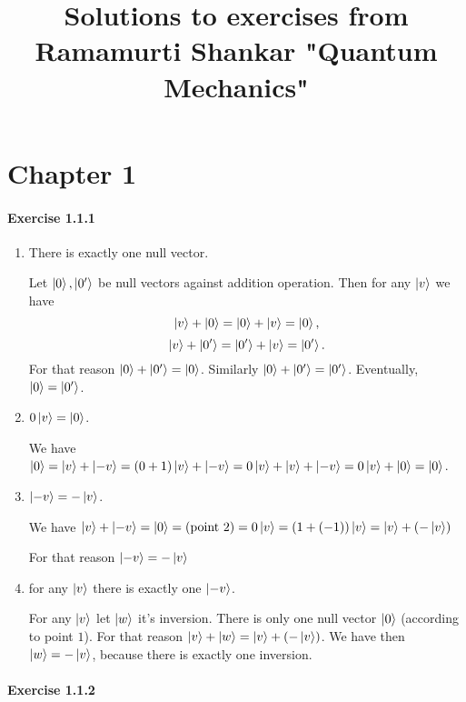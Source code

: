 \documentclass[a4paper]{article}
\title{Solutions to exercises from Ramamurti Shankar "Quantum Mechanics"}
\date{}
\begin{document}
\maketitle
\tableofcontents

\section{Chapter 1}

\paragraph{Exercise 1.1.1}

\begin{enumerate}
    \item There is exactly one null vector.

    Let $\ket{0}, \ket{0'}$ be null vectors against addition operation. Then for any $\ket{v}$ we have
    $$
        \ket{v} + \ket{0} = \ket{0} + \ket{v} = \ket{0},
    $$
    $$
        \ket{v} + \ket{0'} = \ket{0'} + \ket{v} = \ket{0'}.
    $$
    For that reason $\ket{0} + \ket{0'} = \ket{0}$. Similarly $\ket{0} + \ket{0'} = \ket{0'}$. Eventually, $\ket{0} = \ket{0'}$.

    \item $0 \ket{v} = \ket{0}$.

    We have $\ket{0} = \ket{v} + \ket{-v} = (0 + 1) \ket{v} + \ket{-v} = 0 \ket{v} + \ket{v} + \ket{-v} = 0 \ket{v} + \ket{0} = \ket{0}$.

    \item $\ket{- v} = - \ket{v}$.

    We have $\ket{v} + \ket{-v} = \ket{0} = \textrm{(point 2)} = 0 \ket{v} = (1 + (-1)) \ket{v} = \ket{v} + (- \ket{v})$

    For that reason $\ket{- v} = - \ket{v}$

    \item for any $\ket{v}$ there is exactly one $\ket{- v}$.

    For any $\ket{v}$ let $\ket{w}$ it's inversion. There is only one null vector $\ket{0}$ (according to point $1$). For that reason $\ket{v} + \ket{w} = \ket{v} + (- \ket{v})$. We have then $\ket{w} = - \ket{v}$, because there is exactly one inversion. 
\end{enumerate}

\paragraph{Exercise 1.1.2}
\end{document}
